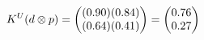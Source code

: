 \documentclass[preview]{standalone}
\begin{document}
\begin{align*}
\special{dvisvgm:raw <g id='unique000'>}K^U(d \otimes p) = \begin{pmatrix} (0.90)(0.84) \\ (0.64)(0.41) \end{pmatrix} = \begin{pmatrix} 0.76 \\ 0.27 \end{pmatrix}\special{dvisvgm:raw </g>}
\end{align*}
\end{document}
